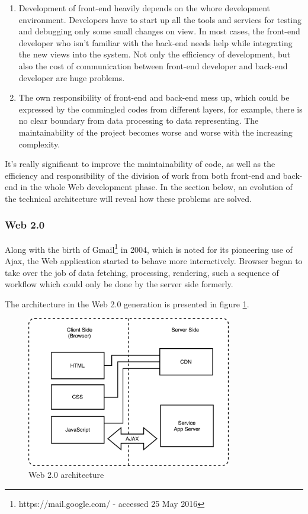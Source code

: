 \begin{enumerate}
\item
Development of front-end heavily depends on the whore development environment. Developers have to start up all the tools and services for testing and debugging only some small changes on view. In most cases, the front-end developer who isn't familiar with the back-end needs help while integrating the new views into the system. Not only the efficiency of development, but also the cost of communication between front-end developer and back-end developer are huge problems.
\item
The own responsibility of front-end and back-end mess up, which could be expressed by the commingled codes from different layers, for example, there is no clear boundary from data processing to data representing. The maintainability of the project becomes worse and worse with the increasing complexity.
\end{enumerate}

It's really significant to improve the maintainability of code, as well as the efficiency and responsibility of the division of work from both front-end and back-end in the whole Web development phase. In the section below, an evolution of the technical architecture will reveal how these problems are solved.

\subsubsection{Web 2.0}
Along with the birth of Gmail\footnote{https://mail.google.com/ - accessed 25 May 2016} in 2004, which is noted for its pioneering use of \gls{Ajax}, the Web application started to behave more interactively. Browser began to take over the job of data fetching, processing, rendering, such a sequence of workflow which could only be done by the server side formerly.

The architecture in the Web 2.0 generation is presented in figure \ref{fig:3.2}.

\begin{figure}[!htbp]
  \centering
    \includegraphics[width=0.8\textwidth]{Figures/tech-Web-arch-2.pdf}
  \caption{Web 2.0 architecture}
  \label{fig:3.2}
\end{figure}

